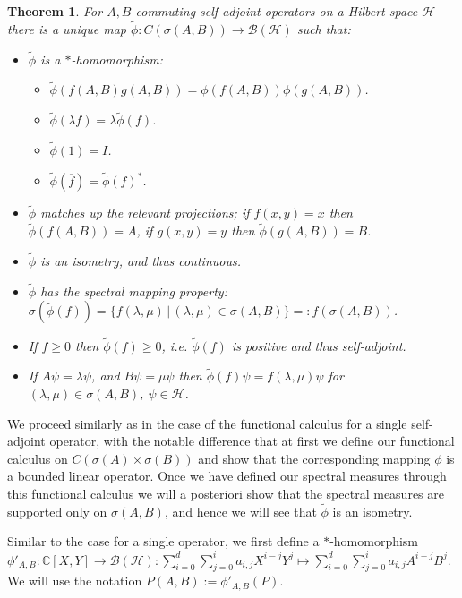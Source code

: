 \documentclass[12pt,oneside]{report}
\newtheorem{thm}{Theorem}[chapter]
\begin{document}
\begin{thm}
    For $A,B$ commuting self-adjoint operators on a Hilbert space $\mathscr{H}$ there is a unique map $\tilde{\phi}: C(\sigma(A,B)) \to \mathscr{B}(\mathscr{H})$ such that:
    \begin{itemize}
        \item $\tilde{\phi}$ is a $*$-homomorphism:
        \begin{itemize}
            \item $\tilde{\phi}(f(A,B)g(A,B)) = \phi(f(A,B))\phi(g(A,B))$.
            \item $\tilde{\phi}(\lambda f) = \lambda \tilde{\phi}(f)$.
            \item $\tilde{\phi}(1) = I$.
            \item $\tilde{\phi}(\overline{f}) = \tilde{\phi}(f)^{*}$.
        \end{itemize}
        \item $\tilde{\phi}$ matches up the relevant projections; if $f(x,y) = x$ then $\tilde{\phi}(f(A,B)) = A$, if $g(x,y) = y$ then $\tilde{\phi}(g(A,B)) = B$.
        \item $\tilde{\phi}$ is an isometry, and thus continuous.
        \item $\tilde{\phi}$ has the spectral mapping property: $\sigma(\tilde{\phi}(f)) = \{ f(\lambda,\mu)  \, | \, (\lambda,\mu) \in \sigma(A,B) \} =: f(\sigma(A,B))$.
        \item If $f \geq 0$ then $\tilde{\phi}(f) \geq 0$, i.e. $\tilde{\phi}(f)$ is positive and thus self-adjoint.
        \item If $A\psi = \lambda \psi$, and $B\psi = \mu \psi$ then $\tilde{\phi}(f)\psi = f(\lambda,\mu)\psi$ for $(\lambda,\mu) \in \sigma(A,B)$, $\psi \in \mathscr{H}$.
    \end{itemize}
\end{thm}

We proceed similarly as in the case of the functional calculus for a single self-adjoint operator, with the notable difference that at first we define our functional calculus on $C(\sigma(A) \times \sigma(B))$ and show that the corresponding mapping $\phi$ is a bounded linear operator. Once we have defined our spectral measures through this functional calculus we will a posteriori show that the spectral measures are supported only on $\sigma(A,B)$, and hence we will see that $\tilde{\phi}$ is an isometry.

Similar to the case for a single operator, we first define a $*$-homomorphism $\phi'_{A,B}: \mathbb{C}[X,Y] \to \mathscr{B}(\mathscr{H}): \sum_{i=0}^{d} \sum_{j=0}^{i} a_{i,j} X^{i - j}Y^{j} \mapsto \sum_{i=0}^{d} \sum_{j=0}^{i} a_{i,j} A^{i - j}B^{j}$. We will use the notation $P(A,B) := \phi'_{A,B}(P)$.
\end{document}
